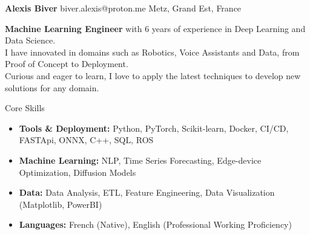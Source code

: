 \documentclass{resume} %
\begin{document}
\begin{center}
    {\Huge \textbf{Alexis Biver}} \hspace{0.3cm} biver.alexis@proton.me \hspace{2.7cm} Metz, Grand Est, France \\
\end{center}

\begin{center}
\textbf{Machine Learning Engineer} with 6 years of experience in Deep Learning and Data Science. \\
I have innovated in domains such as Robotics, Voice Assistants and Data, from Proof of Concept to Deployment. \\
Curious and eager to learn, I love to apply the latest techniques to develop new solutions for any domain.
\end{center}


\begin{rSection}{Core Skills}
\begin{itemize}
    \item \textbf{Tools \& Deployment:} Python, PyTorch, Scikit-learn, Docker, CI/CD, FASTApi, ONNX, C++, SQL, ROS
    \item \textbf{Machine Learning:} NLP, Time Series Forecasting, Edge-device Optimization, Diffusion Models
    \item \textbf{Data:} Data Analysis, ETL, Feature Engineering, Data Visualization (Matplotlib, PowerBI)
    \item \textbf{Languages:} French (Native), English (Professional Working Proficiency)
\end{itemize}
\end{rSection}
\end{document}
